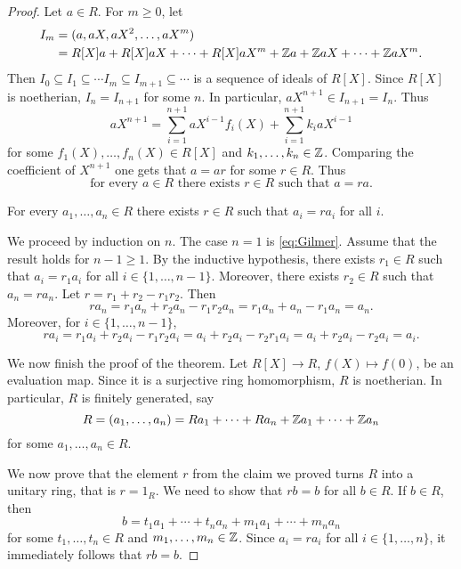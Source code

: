 \begin{proof}
    Let $a\in R$. For $m\geq0$, let
    \begin{align*}
    I_m&=(a,aX,aX^2,\dots,aX^m)\\
    &=R[X]a+R[X]aX+\cdots+R[X]aX^m+\mathbb{Z} a+\mathbb{Z} aX+\cdots+\mathbb{Z} aX^m.
    \end{align*}
    Then $I_0\subseteq I_1\subseteq\cdots I_m\subseteq I_{m+1}\subseteq\cdots$ 
    is a sequence of ideals of $R[X]$. Since $R[X]$ is noetherian,
    $I_n=I_{n+1}$ for some $n$. In particular, 
    $aX^{n+1}\in I_{n+1}=I_n$. Thus
    \[
    aX^{n+1}=\sum_{i=1}^{n+1} aX^{i-1}f_i(X)+\sum_{i=1}^{n+1} k_iaX^{i-1}
    \]
    for some $f_1(X),\dots,f_n(X)\in R[X]$ and 
    $k_1,\dots,k_n\in\mathbb{Z}$. Comparing the coefficient of $X^{n+1}$ 
    one gets that $a=ar$ for some $r\in R$. 
    Thus  
    \begin{equation}
        \label{eq:Gilmer}
        \text{for every $a\in R$ there exists $r\in R$ 
    such that $a=ra$.}
    \end{equation}
    
    \begin{claim}
        For every $a_1,\dots,a_n\in R$ there exists $r\in R$ 
        such that $a_i=ra_i$ for all $i$. 
    \end{claim}
    
    We proceed by induction on $n$. 
    The case $n=1$ is \eqref{eq:Gilmer}. Assume 
    that the result holds for $n-1\geq1$. By the inductive hypothesis, 
    there exists $r_1\in R$ such that $a_i=r_1a_i$ 
    for all $i\in\{1,\dots,n-1\}$. Moreover, 
    there exists $r_2\in R$ such that $a_n=ra_n$. 
    Let $r=r_1+r_2-r_1r_2$. Then
    \[
    ra_n=r_1a_n+r_2a_n-r_1r_2a_n=r_1a_n+a_n-r_1a_n=a_n.
    \]
    Moreover, for $i\in\{1,\dots,n-1\}$, 
    \[
    ra_i=r_1a_i+r_2a_i-r_1r_2a_i=a_i+r_2a_i-r_2r_1a_i=a_i+r_2a_i-r_2a_i=a_i.
    \]
    
    We now finish the proof of the theorem. 
    Let $R[X]\to R$, $f(X)\mapsto f(0)$, be an evaluation map. Since
    it is a surjective ring homomorphism, 
    $R$ is noetherian. In particular, $R$ is finitely generated, 
    say 
    \[
    R=(a_1,\dots,a_n)=Ra_1+\cdots+Ra_n+\mathbb{Z} a_1+\cdots+\mathbb{Z} a_n
    \]
    for some $a_1,\dots,a_n\in R$. 
    
    We now prove that the element $r$ from the claim we proved turns 
    $R$ into a unitary ring, that is $r=1_R$.  
    We need to show that $rb=b$ for all $b\in R$. 
    If $b\in R$, then 
    \[
    b=t_1a_1+\cdots+t_na_n+m_1a_1+\cdots+m_na_n
    \]
    for some $t_1,\dots,t_n\in R$ and $m_1,\dots,m_n\in\mathbb{Z}$. 
    Since $a_i=ra_i$ for all $i\in\{1,\dots,n\}$, it immediately
    follows that
    $rb=b$. 
\end{proof}

